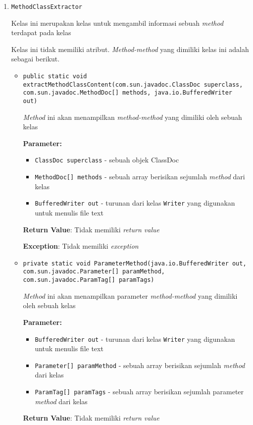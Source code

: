 \begin{enumerate}
\begin{itemize}
\end{itemize}
\item \texttt{MethodClassExtractor}

Kelas ini merupakan kelas untuk mengambil informasi sebuah \textit{method}
 terdapat pada kelas

Kelas ini tidak memiliki atribut. \textit{Method-method} yang dimiliki kelas ini adalah sebagai berikut.
\begin{itemize}
\item \texttt{public static void extractMethodClassContent(com.sun.javadoc.ClassDoc superclass, com.sun.javadoc.MethodDoc[] methods, java.io.BufferedWriter out)}

\textit{Method} ini akan menampilkan \textit{method-method} yang dimiliki
 oleh sebuah kelas

\textbf{Parameter:}
\begin{itemize}
\item \texttt{ClassDoc superclass} - 
sebuah objek ClassDoc
\item \texttt{MethodDoc[] methods} - 
sebuah array berisikan sejumlah \textit{method} dari kelas
\item \texttt{BufferedWriter out} - 
turunan dari kelas \texttt{Writer} yang digunakan untuk menulis
                   file text
\end{itemize}
\textbf{Return Value}: Tidak memiliki \textit{return value}

\textbf{Exception}: Tidak memiliki \textit{exception}

\item \texttt{private static void ParameterMethod(java.io.BufferedWriter out, com.sun.javadoc.Parameter[] paramMethod, com.sun.javadoc.ParamTag[] paramTags)}

\textit{Method} ini akan menampilkan parameter \textit{method-method} yang dimiliki
 oleh sebuah kelas

\textbf{Parameter:}
\begin{itemize}
\item \texttt{BufferedWriter out} - 
turunan dari kelas \texttt{Writer} yang digunakan untuk menulis file text
\item \texttt{Parameter[] paramMethod} - 
sebuah array berisikan sejumlah \textit{method} dari kelas
\item \texttt{ParamTag[] paramTags} - 
sebuah array berisikan sejumlah parameter \textit{method} dari kelas
\end{itemize}
\textbf{Return Value}: Tidak memiliki \textit{return value}


\end{itemize}
\end{enumerate}
